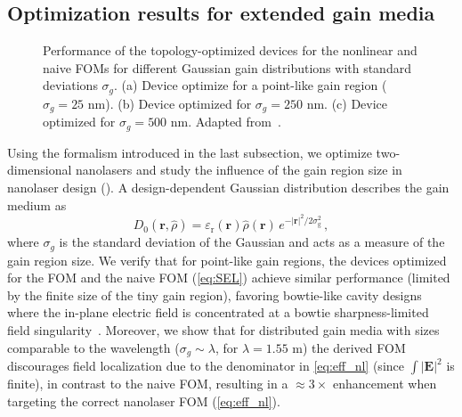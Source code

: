 \subsection*{Optimization results for extended gain media}

\begin{figure}[tb]
    \centering
    \caption{Performance of the topology-optimized devices for the nonlinear and naive FOMs for different Gaussian gain distributions with standard deviations $\sigma_g$. (a) Device optimize for a point-like gain region ($\sigma_g=25$ nm).
    (b) Device optimized for $\sigma_g=250$ nm. (c) Device optimized for $\sigma_g=500$ nm. Adapted from~\cite{ownpub4}.}
    \label{fig:laser_size}
\end{figure}

Using the formalism introduced in the last subsection, we optimize two-dimensional nanolasers and study the influence of the gain region size in 
nanolaser design (). A design-dependent Gaussian distribution describes the gain medium as
\begin{equation}
D_0 (\mathbf{r}, \hat{\rho}) = \varepsilon_{\text{r}}(\mathbf{r})  \hat{\rho}(\mathbf{r}) \, e^{- \vert \mathbf{r} \vert^2 / 2 \sigma_{\text{g}}^2 }\,,
\end{equation}
where
$\sigma_g$ is the standard deviation of the Gaussian and acts as a measure of the gain region size. We verify that for point-like gain regions, the devices optimized for the FOM and the naive FOM (\eqref{eq:SEL})
achieve similar performance (limited by the finite size of the tiny gain region), favoring bowtie-like cavity designs
where the in-plane electric field is concentrated at a bowtie sharpness-limited field singularity~\cite{sing}. Moreover, we show that for
distributed gain media with sizes comparable to the wavelength ($\sigma_g \sim \lambda$, for $\lambda=1.55$ \textmu m) the derived FOM discourages field localization due to the denominator in \eqref{eq:eff_nl} (since $\int \vert \mathbf{E} \vert^2$ is finite), in contrast to the naive FOM, 
resulting in a $\approx 3\times$ enhancement when targeting the correct nanolaser FOM (\eqref{eq:eff_nl}). 
